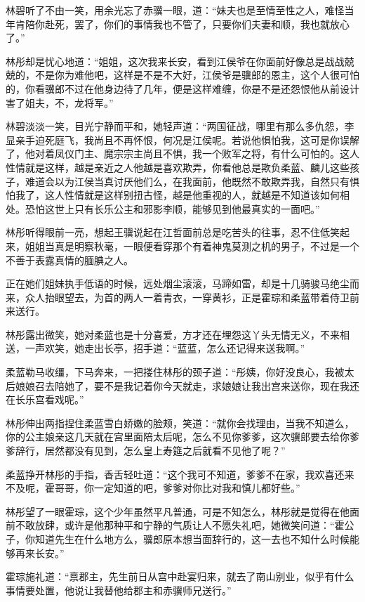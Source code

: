林碧听了不由一笑，用余光忘了赤骥一眼，道：“妹夫也是至情至性之人，难怪当年肯陪你赴死，罢了，你们的事情我也不管了，只要你们夫妻和顺，我也就放心了。”

林彤却是忧心地道：“姐姐，这次我来长安，看到江侯爷在你面前好像总是战战兢兢的，不是你为难他吧，这样是不是不大好，江侯爷是骥郎的恩主，这个人很可怕的，你看骥郎不过在他身边待了几年，便是这样难缠，你是不是还怨恨他从前设计害了姐夫，不，龙将军。”

林碧淡淡一笑，目光宁静而平和，她轻声道：“两国征战，哪里有那么多仇怨，李显亲手迫死庭飞，我尚且不再怀恨，何况是江侯呢。若说他惧怕我，这可是你误解了，他对着凤仪门主、魔宗宗主尚且不惧，我一个败军之将，有什么可怕的。这人性情就是这样，越是亲近之人他越是喜欢欺弄，你看他总是欺负柔蓝、麟儿这些孩子，难道会以为江侯当真讨厌他们么，在我面前，他既然不敢欺弄我，自然只有惧怕我了，这人性情就是这样别扭古怪，越是他重视的人，就越是不知道该如何相处。恐怕这世上只有长乐公主和邪影李顺，能够见到他最真实的一面吧。”

林彤听得眼前一亮，想起王骥说起在江哲面前总是吃苦头的往事，忍不住低笑起来，姐姐当真是明察秋毫，一眼便看穿那个有着神鬼莫测之机的男子，不过是一个不善于表露真情的腼腆之人。

正在她们姐妹执手低语的时候，远处烟尘滚滚，马蹄如雷，却是十几骑骏马绝尘而来，众人抬眼望去，为首的两人一着青衣，一穿黄衫，正是霍琮和柔蓝带着侍卫前来送行。

林彤露出微笑，她对柔蓝也是十分喜爱，方才还在埋怨这丫头无情无义，不来相送，一声欢笑，她走出长亭，招手道：“蓝蓝，怎么还记得来送我啊。”

柔蓝勒马收缰，下马奔来，一把搂住林彤的颈子道：“彤姨，你好没良心，我被太后娘娘召去陪她了，要不是我记着你今天就走，求娘娘让我出宫来送你，现在我还在长乐宫看戏呢。”

林彤伸出两指捏住柔蓝雪白娇嫩的脸颊，笑道：“就你会找理由，当我不知道么，你的公主娘亲这几天就在宫里面陪太后呢，怎么不见你爹爹，这次骥郎要去给你爹爹辞行，居然都没有见到，怎么皇上寿筵之后就看不见他了呢？”

柔蓝挣开林彤的手指，香舌轻吐道：“这个我可不知道，爹爹不在家，我欢喜还来不及呢，霍哥哥，你一定知道的吧，爹爹对你比对我和慎儿都好些。”

林彤望了一眼霍琮，这个少年虽然平凡普通，可是不知怎么，林彤就是觉得在他面前不敢放肆，或许是他那种平和宁静的气质让人不愿失礼吧，她微笑问道：“霍公子，你知道先生在什么地方么，骥郎原本想当面辞行的，这一去也不知什么时候能够再来长安。”

霍琮施礼道：“禀郡主，先生前日从宫中赴宴归来，就去了南山别业，似乎有什么事情要处置，他说让我替他给郡主和赤骥师兄送行。”

